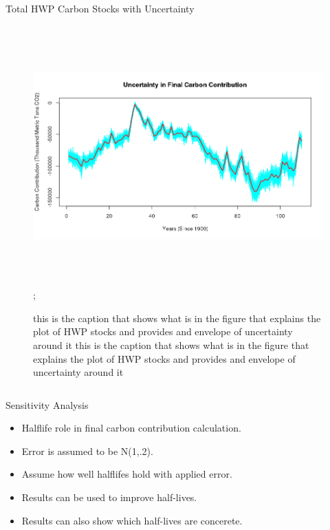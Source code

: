 \documentclass[final]{beamer}\usepackage[]{graphicx}\usepackage[]{color}
\newlength{\onecolwid}
\newlength{\twocolwid}
\begin{document}
\begin{frame}[t]
\begin{columns}[t]
\begin{column}{\twocolwid}
\begin{alertblock}{Total HWP Carbon Stocks with Uncertainty}
\begin{center}
\begin{figure}
    {\includegraphics[width=1\linewidth,height=10cm]{Uncertainty_Plot.png}};
    \caption{this is the caption that shows what is in the figure that explains the plot of HWP stocks and provides and envelope of uncertainty around it
    this is the caption that shows what is in the figure that explains the plot of HWP stocks and provides and envelope of uncertainty around it}
\end{figure}
\end{center}
\end{alertblock} 


\begin{columns}[t,totalwidth=\twocolwid] %

\begin{column}{\onecolwid} %


\begin{block}{Sensitivity Analysis}
\begin{itemize}
\item Halflife role in final carbon contribution calculation.
\item Error is assumed to be N(1,.2). 
\item Assume how well halflifes hold with applied error.
\item Results can be used to improve half-lives.
\item Results can also show which half-lives are concerete.
\end{itemize}
\vspace{0ex}


\end{block}
\end{column}
\end{columns}
\end{column}
\end{columns}
\end{frame}
\end{document}
